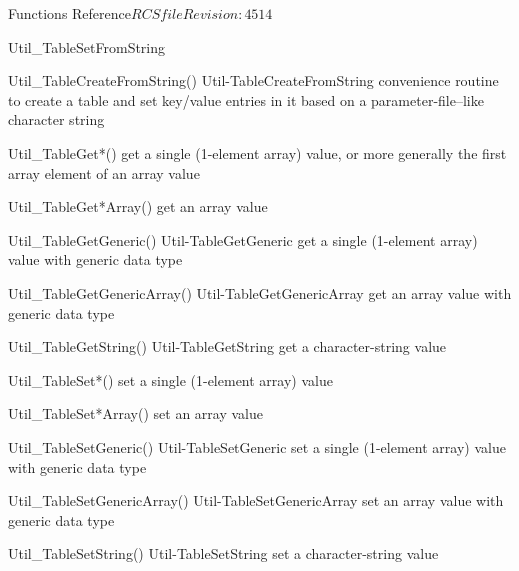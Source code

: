 \begin{cactuspart}{ Functions Reference}{$RCSfile$}{$Revision: 4514 $}
\begin{FunctionDescription}{Util\_TableSetFromString}
\begin{SeeAlsoSection}
\begin{SeeAlso2} {Util\_TableCreateFromString()} {Util-TableCreateFromString}
convenience routine to create a table and set key/value entries
in it based on a parameter-file--like character string
\end{SeeAlso2}
\begin{SeeAlso}{Util\_TableGet*()}
get a single (1-element array) value,
or more generally the first array element of an array value
\end{SeeAlso}
\begin{SeeAlso}{Util\_TableGet*Array()}
get an array value
\end{SeeAlso}
\begin{SeeAlso2} {Util\_TableGetGeneric()} {Util-TableGetGeneric}
get a single (1-element array) value with generic data type
\end{SeeAlso2}
\begin{SeeAlso2} {Util\_TableGetGenericArray()} {Util-TableGetGenericArray}
get an array value with generic data type
\end{SeeAlso2}
\begin{SeeAlso2} {Util\_TableGetString()} {Util-TableGetString}
get a character-string value
\end{SeeAlso2}
\begin{SeeAlso}{Util\_TableSet*()}
set a single (1-element array) value
\end{SeeAlso}
\begin{SeeAlso}{Util\_TableSet*Array()}
set an array value
\end{SeeAlso}
\begin{SeeAlso2} {Util\_TableSetGeneric()} {Util-TableSetGeneric}
set a single (1-element array) value with generic data type
\end{SeeAlso2}
\begin{SeeAlso2} {Util\_TableSetGenericArray()} {Util-TableSetGenericArray}
set an array value with generic data type
\end{SeeAlso2}
\begin{SeeAlso2} {Util\_TableSetString()} {Util-TableSetString}
set a character-string value
\end{SeeAlso2}
\end{SeeAlsoSection}


\end{FunctionDescription}
\end{cactuspart}
